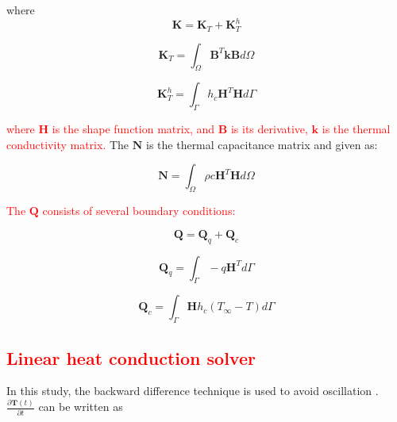 \documentclass[review]{elsarticle}
\begin{document}
\noindent where
\begin{equation*}
    \mathbf{K} =  \mathbf{K}_T+\mathbf{K}_T^h 
\end{equation*}

\begin{equation*}
    \mathbf{K}_T = \int_\Omega \mathbf{B}^T \mathbf{k} \mathbf{B} d \Omega
\end{equation*}


\begin{equation*}
    \mathbf{K}_T^h = \int_\Gamma h_c \mathbf{H}^T \mathbf{H} d \Gamma
\end{equation*}


\noindent \textcolor{red}{where $\mathbf{H}$ is the shape function matrix, and $\mathbf{B}$ is its derivative, $\mathbf{k}$ is the thermal conductivity matrix.} The $\mathbf{N}$ is the thermal capacitance matrix and given as:

\begin{equation*}
    \mathbf{N} = \int_\Omega \rho c\mathbf{H}^T\mathbf{H} d \Omega
\end{equation*}

\textcolor{red}{The $\mathbf{Q}$ consists of several boundary conditions:}

\begin{equation*}
    \mathbf{Q} = \mathbf{Q}_q+\mathbf{Q}_c
\end{equation*}

\begin{equation*}
    \mathbf{Q}_q = \int_\Gamma -q \mathbf{H}^T d\Gamma
\end{equation*}

\begin{equation*}
    \mathbf{Q}_c = \int_\Gamma \mathbf{H} h_c (T_\infty-T)d \Gamma
\end{equation*}

\subsection{\textcolor{red}{Linear heat conduction solver}}
In this study, the backward difference technique is used to avoid oscillation \cite{feng2016fast}. $\frac{\partial \mathbf{T}(t)}{\partial t}$ can be written as 
\end{document}
